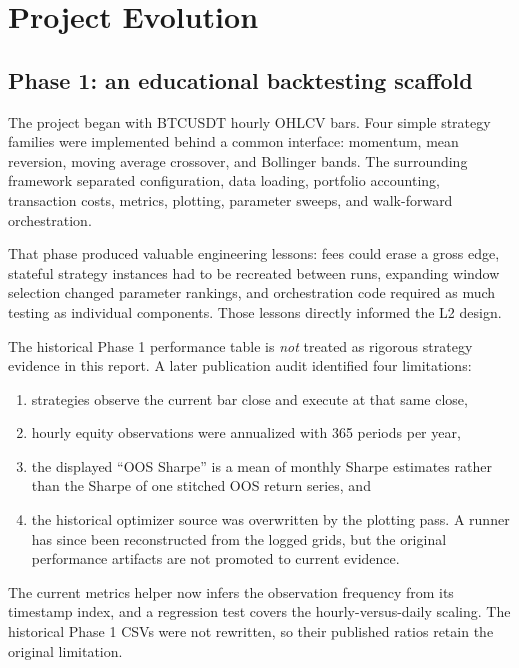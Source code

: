 \section{Project Evolution}

\subsection{Phase 1: an educational backtesting scaffold}

The project began with BTCUSDT hourly OHLCV bars. Four simple strategy families
were implemented behind a common interface: momentum, mean reversion, moving
average crossover, and Bollinger bands. The surrounding framework separated
configuration, data loading, portfolio accounting, transaction costs, metrics,
plotting, parameter sweeps, and walk-forward orchestration.

That phase produced valuable engineering lessons: fees could erase a gross
edge, stateful strategy instances had to be recreated between runs, expanding
window selection changed parameter rankings, and orchestration code required as
much testing as individual components. Those lessons directly informed the L2
design.

The historical Phase 1 performance table is \emph{not} treated as rigorous
strategy evidence in this report. A later publication audit identified four
limitations:

\begin{enumerate}
  \item strategies observe the current bar close and execute at that same close,
  \item hourly equity observations were annualized with 365 periods per year,
  \item the displayed ``OOS Sharpe'' is a mean of monthly Sharpe estimates rather
        than the Sharpe of one stitched OOS return series, and
  \item the historical optimizer source was overwritten by the plotting pass.
        A runner has since been reconstructed from the logged grids, but the
        original performance artifacts are not promoted to current evidence.
\end{enumerate}

The current metrics helper now infers the observation frequency from its
timestamp index, and a regression test covers the hourly-versus-daily scaling.
The historical Phase 1 CSVs were not rewritten, so their published ratios
retain the original limitation.

